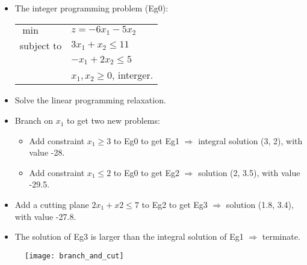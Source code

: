 \documentclass[11pt, a4paper, landscape]{article}
\begin{document}
\NewPage{}
\vfill
\begin{itemize}
\item The integer programming problem (Eg0):
\begin{table}
  \centering
  \begin{tabular}{l l}
  	$\min$ 		& $z = -6x_1 - 5x_2$\\
	subject to  & $3x_1 + x_2 \leq 11$\\
                & $-x_1 + 2x_2 \leq 5$\\
                & $x_1, x_2 \geq 0$, interger.
  \end{tabular}
\end{table}
\item Solve the linear programming relaxation.
\item Branch on $x_1$ to get two new problems:
\begin{itemize}
\item Add constraint $x_1 \geq 3$ to Eg0 to get Eg1 $\Rightarrow$ integral solution (3, 2), with value -28.
\item Add constraint $x_1 \leq 2$ to Eg0 to get Eg2 $\Rightarrow$ solution (2, 3.5), with value -29.5.
\end{itemize}
\item Add a cutting plane $2x_1 + x2 \leq 7$ to Eg2 to get Eg3 $\Rightarrow$ solution (1.8, 3.4), with value -27.8.
\item The solution of Eg3 is larger than the integral solution of Eg1 $\Rightarrow$ terminate.
\end{itemize}
\vfill


\NewPage{}
\vfill
\begin{figure}
	\centering
	\texttt{[image: branch\_and\_cut]}
\end{figure}
\vfill
\end{document}
